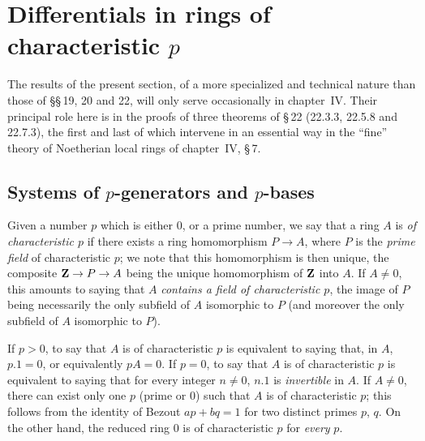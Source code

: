 \section{Differentials in rings of characteristic \texorpdfstring{$p$}{p}}
\label{section:0.21}

The results of the present section, of a more specialized and technical nature than those of \S\S\,19, 20 and 22, will only serve occasionally in chapter~IV.
Their principal role here is in the proofs of three theorems of \S\,22 (22.3.3, 22.5.8 and 22.7.3), the first and last of which intervene in an essential way in the ``fine'' theory of Noetherian local rings of chapter~IV, \S\,7.

\subsection{Systems of \texorpdfstring{$p$}{p}-generators and \texorpdfstring{$p$}{p}-bases}
\label{subsection:0.21.1}

\begin{env}[21.1.1]
\label{0.21.1.1}
Given a number $p$ which is either $0$, or a prime number, we say that a ring $A$ is \emph{of characteristic $p$} if there exists a ring homomorphism $P\to A$, where $P$ is the \emph{prime field} of characteristic $p$; we note that this homomorphism is then unique, the composite $\mathbf{Z}\to P\to A$ being the unique homomorphism of $\mathbf{Z}$ into $A$.
If $A\neq 0$, this amounts to saying that $A$ \emph{contains a field of characteristic $p$}, the image of $P$ being necessarily the only subfield of $A$ isomorphic to $P$ (and moreover the only subfield of $A$ isomorphic to $P$).
\end{env}

\begin{env}[21.1.2]
\label{0.21.1.2}
If $p>0$, to say that $A$ is of characteristic $p$ is equivalent to saying that, in $A$, $p.1=0$, or equivalently $pA=0$.
If $p=0$, to say that $A$ is of characteristic $p$ is equivalent to saying that for every integer $n\neq 0$, $n.1$ is \emph{invertible} in $A$.
If $A\neq 0$, there can exist only one $p$ (prime or $0$) such that $A$ is of characteristic $p$; this follows from the identity of Bezout $ap+bq=1$ for two distinct primes $p$, $q$.
On the other hand, the reduced ring $0$ is of characteristic $p$ for \emph{every} $p$.
\end{env}

